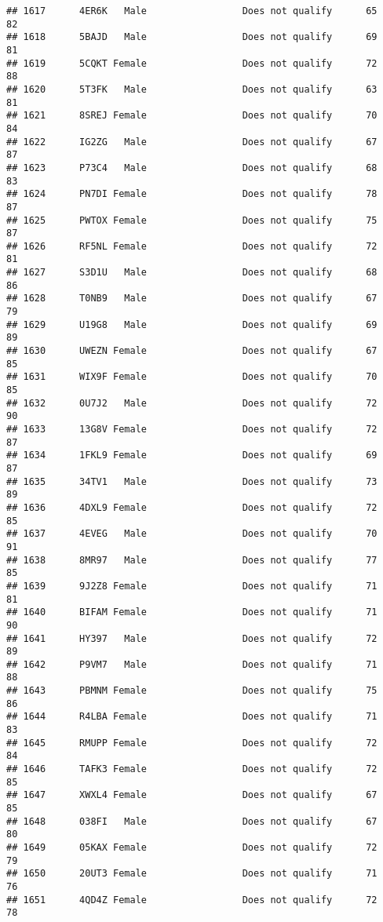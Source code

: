 \documentclass[
]{article}
\begin{document}
\begin{verbatim}
## 1617      4ER6K   Male                 Does not qualify      65       82
## 1618      5BAJD   Male                 Does not qualify      69       81
## 1619      5CQKT Female                 Does not qualify      72       88
## 1620      5T3FK   Male                 Does not qualify      63       81
## 1621      8SREJ Female                 Does not qualify      70       84
## 1622      IG2ZG   Male                 Does not qualify      67       87
## 1623      P73C4   Male                 Does not qualify      68       83
## 1624      PN7DI Female                 Does not qualify      78       87
## 1625      PWTOX Female                 Does not qualify      75       87
## 1626      RF5NL Female                 Does not qualify      72       81
## 1627      S3D1U   Male                 Does not qualify      68       86
## 1628      T0NB9   Male                 Does not qualify      67       79
## 1629      U19G8   Male                 Does not qualify      69       89
## 1630      UWEZN Female                 Does not qualify      67       85
## 1631      WIX9F Female                 Does not qualify      70       85
## 1632      0U7J2   Male                 Does not qualify      72       90
## 1633      13G8V Female                 Does not qualify      72       87
## 1634      1FKL9 Female                 Does not qualify      69       87
## 1635      34TV1   Male                 Does not qualify      73       89
## 1636      4DXL9 Female                 Does not qualify      72       85
## 1637      4EVEG   Male                 Does not qualify      70       91
## 1638      8MR97   Male                 Does not qualify      77       85
## 1639      9J2Z8 Female                 Does not qualify      71       81
## 1640      BIFAM Female                 Does not qualify      71       90
## 1641      HY397   Male                 Does not qualify      72       89
## 1642      P9VM7   Male                 Does not qualify      71       88
## 1643      PBMNM Female                 Does not qualify      75       86
## 1644      R4LBA Female                 Does not qualify      71       83
## 1645      RMUPP Female                 Does not qualify      72       84
## 1646      TAFK3 Female                 Does not qualify      72       85
## 1647      XWXL4 Female                 Does not qualify      67       85
## 1648      038FI   Male                 Does not qualify      67       80
## 1649      05KAX Female                 Does not qualify      72       79
## 1650      20UT3 Female                 Does not qualify      71       76
## 1651      4QD4Z Female                 Does not qualify      72       78

\end{verbatim}
\end{document}
